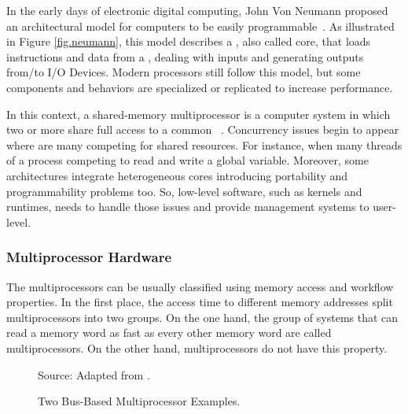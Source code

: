 		In the early days of electronic digital computing, John Von Neumann
		proposed an architectural model for computers to be easily programmable~\cite{von-neumann:model}.
		As illustrated in Figure \ref{fig.neumann}, this model describes a \cpu,
		also called core, that loads instructions and data from a \mmu,
		dealing with inputs and generating outputs from/to I/O Devices.
		Modern processors still follow this model, but some components and
		behaviors are specialized or replicated to increase performance.

		In this context, a shared-memory multiprocessor is a computer system
		in which two or more \cpus share full access to a common \ram~\cite{tanenbaum:4ed}.
		Concurrency issues begin to appear where are many \cpus competing for
		shared resources.
		For instance, when many threads of a process competing to read and write a global variable.
		Moreover, some architectures integrate heterogeneous cores introducing portability
		and programmability problems too.
		So, low-level software, such as \os kernels and runtimes, needs to handle those
		issues and provide management systems to user-level.

		\subsubsection{Multiprocessor Hardware}
		\label{sec.multiprocessor-hw}

			The multiprocessors can be usually classified using memory access
			and workflow properties.
			In the first place, the access time to different memory addresses
			split multiprocessors into two groups.
			On the one hand, the group of systems that can read a memory word
			as fast as every other memory word are called \uma multiprocessors.
			On the other hand, \numa multiprocessors do not have this property.

			\begin{figure}[t]
				\centering
				\caption{Two Bus-Based \uma Multiprocessor Examples.}

				\qquad

				Source: Adapted from \cite{tanenbaum:4ed}.

				\label{fig:uma}%
			\end{figure}

